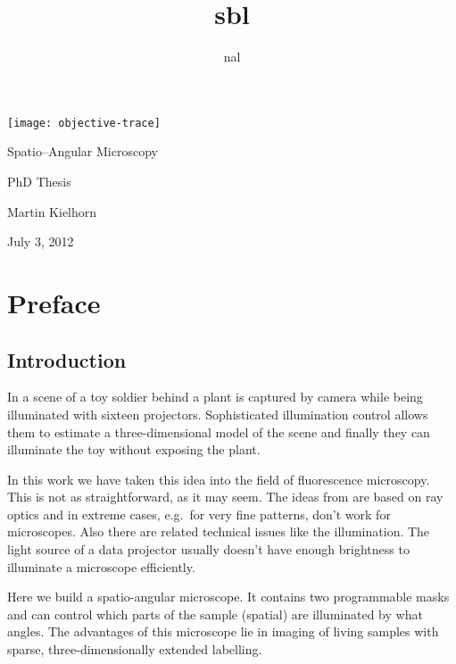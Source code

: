 \documentclass[oneside,a4paper,12pt,BCOR20mm,DIV14]{scrbook}
\title{sbl}
\author{nal}
\begin{document}
\listoftodos
\begin{titlepage}
  
  \hspace{-4cm}
  \texttt{[image: objective-trace]}



  \vspace{-5cm}
  
  \hspace{4cm}\textsf{\Huge Spatio--Angular Microscopy}
  
  \vspace{2cm}
  \hspace{6cm}\textsf{\huge PhD Thesis}


  \vspace{3cm}
  \hspace{4cm}\textsf{\Large Martin Kielhorn}
  
  \vspace{1cm}
  \hspace{4cm}\textsf{\Large July 3, 2012}
\end{titlepage}
\newpage

\section*{Preface}
\subsection*{Introduction}
In \citet{Levoy2003} a scene of a toy soldier behind a plant is
captured by camera while being illuminated with sixteen projectors.
Sophisticated illumination control allows them to estimate a
three-dimensional model of the scene and finally they can illuminate
the toy without exposing the plant.

In this work we have taken this idea into the field of fluorescence
microscopy. This is not as straightforward, as it may seem.  The ideas
from \citet{Levoy2003} are based on ray optics and in extreme cases,
e.g.\ for very fine patterns, don't work for microscopes. Also there
are related technical issues like the illumination. The light source
of a data projector usually doesn't have enough brightness to
illuminate a microscope efficiently.

Here we build a spatio-angular microscope. It contains two
programmable masks and can control which parts of the sample (spatial)
are illuminated by what angles. The advantages of this microscope lie
in imaging of living samples with sparse, three-dimensionally extended
labelling.
\end{document}
